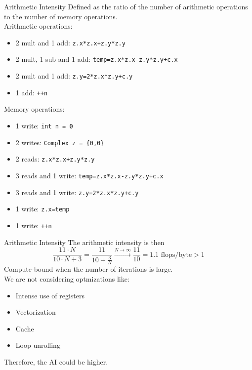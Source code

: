 %
%
\begin{frame}[fragile]{Arithmetic Intensity}
    Defined as the ratio of the number of arithmetic operations to
    the number of memory operations. \\
    Arithmetic operations:
    \begin{itemize}
        \item 2 mult and 1 add: \texttt{z.x*z.x+z.y*z.y}
        \item 2 mult, 1 sub and 1 add: \texttt{temp=z.x*z.x-z.y*z.y+c.x}
        \item 2 mult and 1 add: \texttt{z.y=2*z.x*z.y+c.y}
        \item 1 add: \texttt{++n}
    \end{itemize}
    Memory operations:
    \begin{itemize}
        \item 1 write: \texttt{int n = 0} 
        \item 2 writes: \texttt{Complex z = \{0,0\}}
        \item 2 reads: \texttt{z.x*z.x+z.y*z.y}
        \item 3 reads and 1 write: \texttt{temp=z.x*z.x-z.y*z.y+c.x}
        \item 3 reads and 1 write: \texttt{z.y=2*z.x*z.y+c.y}
        \item 1 write: \texttt{z.x=temp}
        \item 1 write: \texttt{++n}
    \end{itemize}
\end{frame}
\begin{frame}[fragile]{Arithmetic Intensity}
    The arithmetic intensity is then
    $$
        \frac{11 \cdot N}{ 10\cdot N + 3} 
        = \frac{11}{10+\frac{3}{N}} \xrightarrow{N \to \infty} \frac{11}{10}
        = 1.1 \text{ flops/byte} > 1
    $$
    Compute-bound when the number of iterations is large. \\
    We are not considering optmizations like:
    \begin{itemize}
        \item Intense use of registers
        \item Vectorization
        \item Cache
        \item Loop unrolling
    \end{itemize}
    Therefore, the AI could be higher.
\end{frame}

